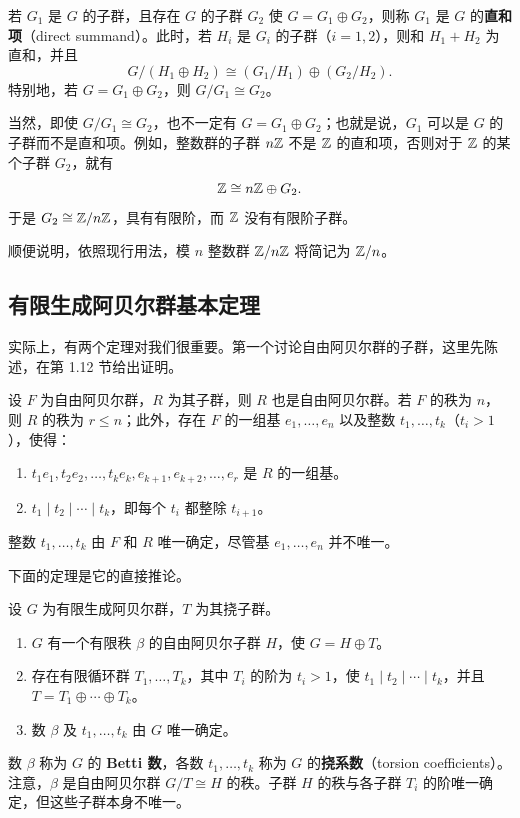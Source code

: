 若 $G_1$ 是 $G$ 的子群，且存在 $G$ 的子群 $G_2$ 使 $G=G_1\oplus G_2$，则称 $G_1$ 是 $G$ 的\textbf{直和项}（direct summand）。此时，若 $H_i$ 是 $G_i$ 的子群（$i=1,2$），则和 $H_1+H_2$ 为直和，并且
\[
G/(H_1\oplus H_2)\cong(G_1/H_1)\oplus(G_2/H_2).
\]
特别地，若 $G=G_1\oplus G_2$，则 $G/G_1\cong G_2$。

当然，即使 $G/G_1\cong G_2$，也不一定有 $G=G_1\oplus G_2$；也就是说，$G_1$ 可以是 $G$ 的子群而不是直和项。例如，整数群的子群 $n\mathbb{Z}$ 不是 $\mathbb{Z}$ 的直和项，否则对于 $\mathbb{Z}$ 的某个子群 $G_2$，就有
\[
\mathbb{Z}\cong n\mathbb{Z}\oplus G_2.
\]
于是 $G_2\cong\mathbb{Z}/n\mathbb{Z}$，具有有限阶，而 $\mathbb{Z}$ 没有有限阶子群。

顺便说明，依照现行用法，模 $n$ 整数群 $\mathbb{Z}/n\mathbb{Z}$ 将简记为 $\mathbb{Z}/n$。

\subsection*{有限生成阿贝尔群基本定理}
实际上，有两个定理对我们很重要。第一个讨论自由阿贝尔群的子群，这里先陈述，在第 1.12 节给出证明。

设 $F$ 为自由阿贝尔群，$R$ 为其子群，则 $R$ 也是自由阿贝尔群。若 $F$ 的秩为 $n$，则 $R$ 的秩为 $r\leq n$；此外，存在 $F$ 的一组基 $e_1,\ldots,e_n$ 以及整数 $t_1,\ldots,t_k$（$t_i>1$），使得：
\begin{enumerate}[label=(\arabic*)]
\item $t_1e_1,t_2e_2,\ldots,t_ke_k,e_{k+1},e_{k+2},\ldots,e_r$ 是 $R$ 的一组基。
\item $t_1\mid t_2\mid\cdots\mid t_k$，即每个 $t_i$ 都整除 $t_{i+1}$。
\end{enumerate}
整数 $t_1,\ldots,t_k$ 由 $F$ 和 $R$ 唯一确定，尽管基 $e_1,\ldots,e_n$ 并不唯一。

下面的定理是它的直接推论。

设 $G$ 为有限生成阿贝尔群，$T$ 为其挠子群。
\begin{enumerate}[label=(\alph*)]
\item $G$ 有一个有限秩 $\beta$ 的自由阿贝尔子群 $H$，使 $G=H\oplus T$。
\item 存在有限循环群 $T_1,\ldots,T_k$，其中 $T_i$ 的阶为 $t_i>1$，使 $t_1\mid t_2\mid\cdots\mid t_k$，并且 $T=T_1\oplus\cdots\oplus T_k$。
\item 数 $\beta$ 及 $t_1,\ldots,t_k$ 由 $G$ 唯一确定。
\end{enumerate}
数 $\beta$ 称为 $G$ 的 \textbf{Betti 数}，各数 $t_1,\ldots,t_k$ 称为 $G$ 的\textbf{挠系数}（torsion coefficients）。注意，$\beta$ 是自由阿贝尔群 $G/T\cong H$ 的秩。子群 $H$ 的秩与各子群 $T_i$ 的阶唯一确定，但这些子群本身不唯一。

